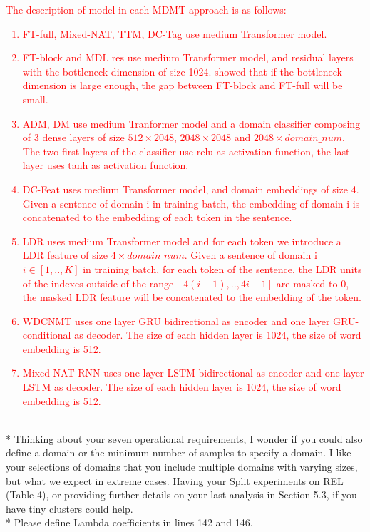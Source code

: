 \documentclass[12pt,times,a4paper,twoside]{article}
\newcommand{\fyTodo}[1]{\Todo[FY:]{\textcolor{orange}{#1}}}
\theoremstyle{definition}
\begin{document}
\textcolor{red}{The description of model in each MDMT approach is as follows:
\begin{enumerate}
	\item FT-full, Mixed-NAT, TTM, DC-Tag use medium Transformer model.
	\item FT-block and MDL res use medium Transformer model, and residual layers with the bottleneck dimension of size 1024. \cite{Bapna19simple} showed that if the bottleneck dimension is large enough, the gap between FT-block and FT-full will be small.
	\item ADM, DM use medium Tranformer model and a domain classifier composing of 3 dense layers of size $512 \times 2048$, $2048 \times 2048$ and $2048 \times domain\_num$. The two first layers of the classifier use relu as activation function, the last layer uses tanh as activation function.
	\item DC-Feat uses medium Transformer model, and domain embeddings of size 4. Given a sentence of domain i in training batch, the embedding of domain i is concatenated to the embedding of each token in the sentence.
	\item LDR uses medium Transformer model and for each token we introduce a LDR feature of size $4 \times domain\_num$. Given a sentence of domain i $i\in[1,..,K]$ in training batch, for each token of the sentence, the LDR units of the indexes outside of the range $[4(i-1),..,4i-1]$ are masked to 0, the masked LDR feature will be concatenated to the embedding of the token.
	\item WDCNMT uses one layer GRU bidirectional as encoder and one layer GRU-conditional as decoder. The size of each hidden layer is 1024, the size of word embedding is 512.
	\item Mixed-NAT-RNN uses one layer LSTM bidirectional as encoder and one layer LSTM as decoder. The size of each hidden layer is 1024, the size of word embedding is 512. 
\end{enumerate}
}
\fyTodo{system's description}
\\
* Thinking about your seven operational requirements, I wonder if you could also define a domain or the minimum number of samples to specify a domain. I like your selections of domains that you include multiple domains with varying sizes, but what we expect in extreme cases. Having your Split experiments on REL (Table 4), or providing further details on your last analysis in Section 5.3, if you have tiny clusters could help.
\\
* Please define Lambda coefficients in lines 142 and 146.
\end{document}
